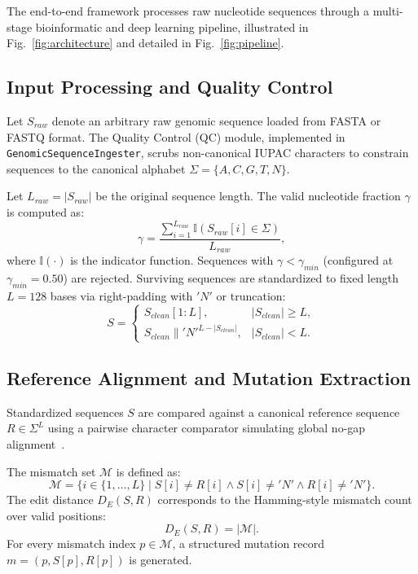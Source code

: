 \documentclass[conference]{IEEEtran}
\begin{document}
The end-to-end framework processes raw nucleotide sequences through a multi-stage bioinformatic and deep learning pipeline, illustrated in Fig.~\ref{fig:architecture} and detailed in Fig.~\ref{fig:pipeline}.

\subsection{Input Processing and Quality Control}
Let $S_{raw}$ denote an arbitrary raw genomic sequence loaded from FASTA or FASTQ format. The Quality Control (QC) module, implemented in \texttt{GenomicSequenceIngester}, scrubs non-canonical IUPAC characters to constrain sequences to the canonical alphabet $\Sigma = \{A, C, G, T, N\}$.

Let $L_{raw} = |S_{raw}|$ be the original sequence length. The valid nucleotide fraction $\gamma$ is computed as:
\begin{equation}
\gamma = \frac{\sum_{i=1}^{L_{raw}} \mathbb{I}(S_{raw}[i] \in \Sigma)}{L_{raw}},
\label{eq:qc_fraction}
\end{equation}
where $\mathbb{I}(\cdot)$ is the indicator function. Sequences with $\gamma < \gamma_{min}$ (configured at $\gamma_{min} = 0.50$) are rejected. Surviving sequences are standardized to fixed length $L = 128$ bases via right-padding with $'N'$ or truncation:
\begin{equation}
S = \begin{cases} 
S_{clean}[1:L], & |S_{clean}| \ge L, \\
S_{clean} \parallel 'N'^{L - |S_{clean}|}, & |S_{clean}| < L.
\end{cases}
\label{eq:pad_truncate}
\end{equation}

\subsection{Reference Alignment and Mutation Extraction}
Standardized sequences $S$ are compared against a canonical reference sequence $R \in \Sigma^L$ using a pairwise character comparator simulating global no-gap alignment~\cite{altschul1990blast}.

The mismatch set $\mathcal{M}$ is defined as:
\begin{equation}
\mathcal{M} = \{ i \in \{1, \dots, L\} \mid S[i] \neq R[i] \land S[i] \neq 'N' \land R[i] \neq 'N' \}.
\label{eq:mismatch_set}
\end{equation}
The edit distance $D_E(S, R)$ corresponds to the Hamming-style mismatch count over valid positions:
\begin{equation}
D_E(S, R) = |\mathcal{M}|.
\label{eq:edit_distance}
\end{equation}
For every mismatch index $p \in \mathcal{M}$, a structured mutation record $m = (p, S[p], R[p])$ is generated.
\end{document}
